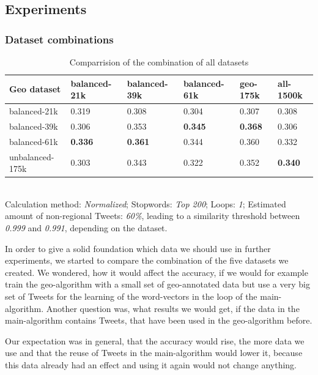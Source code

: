 \documentclass[../Main.tex]{subfiles}
\begin{document}
\subsection{Experiments}
\subsubsection{Dataset combinations}
\begin{table}[b]
    \begin{tabular}{|l|lllll|}
    \hline
    Geo dataset     & balanced-21k & balanced-39k & balanced-61k & geo-175k & all-1500k \\ \hline
    balanced-21k    & 0.319        & 0.308        & 0.304        & 0.307           & 0.308       \\
    balanced-39k    & 0.306        & 0.353       & \textbf{0.345}        & \textbf{0.368 }          & 0.306       \\
    balanced-61k    & \textbf{0.336}        & \textbf{0.361}        & 0.344        &0.360           & 0.332       \\
    unbalanced-175k & 0.303        & 0.343        & 0.322        & 0.352           & \textbf{0.340}       \\ \hline
    \end{tabular} \\

  Calculation method: \textit{Normalized}; Stopwords: \textit{Top 200}; Loops: \textit{1}; Estimated amount of non-regional Tweets: \textit{60\%}, leading to a similarity threshold between \textit{0.999} and \textit{0.991}, depending on the dataset.
  \caption{Comparrision of the combination of all datasets}
  \label{geo_datasets}
\end{table}

In order to give a solid foundation which data we should use in further experiments, we started to compare the combination of the five datasets we created. We wondered, how it would affect the accuracy, if we would for example train the geo-algorithm with a small set of geo-annotated data but use a very big set of Tweets for the learning of the word-vectors in the loop of the main-algorithm. Another question was, what results we would get, if the data in the main-algorithm contains Tweets, that have been used in the geo-algorithm before. 

Our expectation was in general, that the accuracy would rise, the more data we use and that the reuse of Tweets in the main-algorithm would lower it, because this data already had an effect and using it again would not change anything.
\end{document}
